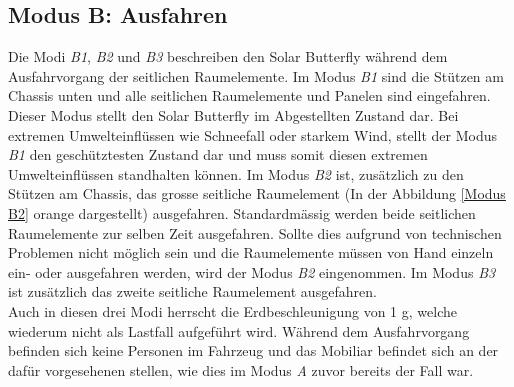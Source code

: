 \subsection{Modus B: Ausfahren}
Die Modi \emph{B1}, \emph{B2} und \emph{B3} beschreiben den Solar Butterfly während dem Ausfahrvorgang der seitlichen Raumelemente. Im Modus \emph{B1} sind die Stützen am Chassis unten und alle seitlichen Raumelemente und Panelen sind eingefahren. Dieser Modus stellt den Solar Butterfly im \glqq Abgestellten\grqq{} Zustand dar. Bei extremen Umwelteinflüssen wie Schneefall oder starkem Wind, stellt der Modus \emph{B1} den geschütztesten Zustand dar und muss somit diesen extremen Umwelteinflüssen standhalten können.
Im Modus \emph{B2} ist, zusätzlich zu den Stützen am Chassis, das grosse seitliche Raumelement (In der Abbildung \ref{Modus B2} orange dargestellt) ausgefahren. Standardmässig werden beide seitlichen Raumelemente zur selben Zeit ausgefahren. Sollte dies aufgrund von technischen Problemen nicht möglich sein und die Raumelemente müssen \glqq von Hand\grqq{} einzeln ein- oder ausgefahren werden, wird der Modus \emph{B2} eingenommen. Im Modus \emph{B3} ist zusätzlich das zweite seitliche Raumelement ausgefahren.\\
Auch in diesen drei Modi herrscht die Erdbeschleunigung von 1 g, welche wiederum nicht als Lastfall aufgeführt wird. Während dem Ausfahrvorgang befinden sich keine Personen im Fahrzeug und das Mobiliar befindet sich an der dafür vorgesehenen stellen, wie dies im Modus \emph{A} zuvor bereits der Fall war.


